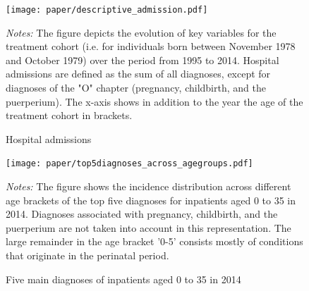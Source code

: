 \documentclass[11pt, a4paper]{article} %
\begin{document}

\bigskip
\begin{figure}[H]\centering
	\caption{Hospital admissions}\label{fig: descriptive_hospital_admission}
	\texttt{[image: paper/descriptive\_admission.pdf]}
		\begin{minipage}{\linewidth}
		\scriptsize{\emph{Notes:} The figure depicts the evolution of key variables for the treatment cohort (i.e. for individuals born between November 1978 and October 1979) over the period from 1995 to 2014. Hospital admissions are defined as the sum of all diagnoses, except for diagnoses of the "O" chapter (pregnancy, childbirth, and the puerperium). The x-axis shows in addition to the year the age of the treatment cohort in brackets.} 
	\end{minipage}
\end{figure}
\begin{figure}[H]\centering
	\caption{Five main diagnoses of inpatients aged 0 to 35 in 2014}\label{fig: top5diagnosis_in_2014_across_agegroups}
	\texttt{[image: paper/top5diagnoses\_across\_agegroups.pdf]}
	\begin{minipage}{\linewidth}
	\scriptsize{\emph{Notes:} The figure shows the incidence distribution across different age brackets of the top five diagnoses for inpatients aged 0 to 35 in 2014. Diagnoses associated with pregnancy, childbirth, and the puerperium are not taken into account in this representation. The large remainder in the age bracket '0-5' consists mostly of conditions that originate in the perinatal period.}
	\end{minipage}
\end{figure}
\end{document}
